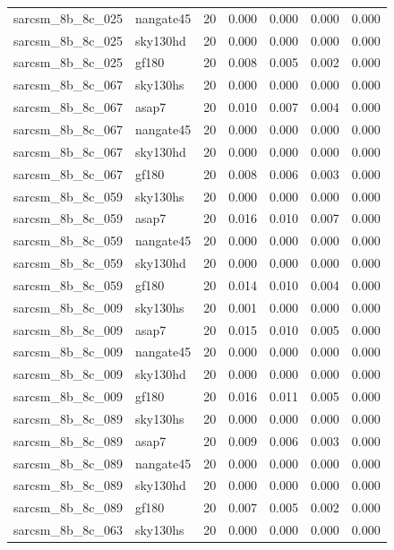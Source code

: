 \begin{tabular}{llrrrrr}
sarcsm\_8b\_8c\_025 & nangate45 & 20 & 0.000 & 0.000 & 0.000 & 0.000 \\
sarcsm\_8b\_8c\_025 & sky130hd & 20 & 0.000 & 0.000 & 0.000 & 0.000 \\
sarcsm\_8b\_8c\_025 & gf180 & 20 & 0.008 & 0.005 & 0.002 & 0.000 \\
sarcsm\_8b\_8c\_067 & sky130hs & 20 & 0.000 & 0.000 & 0.000 & 0.000 \\
sarcsm\_8b\_8c\_067 & asap7 & 20 & 0.010 & 0.007 & 0.004 & 0.000 \\
sarcsm\_8b\_8c\_067 & nangate45 & 20 & 0.000 & 0.000 & 0.000 & 0.000 \\
sarcsm\_8b\_8c\_067 & sky130hd & 20 & 0.000 & 0.000 & 0.000 & 0.000 \\
sarcsm\_8b\_8c\_067 & gf180 & 20 & 0.008 & 0.006 & 0.003 & 0.000 \\
sarcsm\_8b\_8c\_059 & sky130hs & 20 & 0.000 & 0.000 & 0.000 & 0.000 \\
sarcsm\_8b\_8c\_059 & asap7 & 20 & 0.016 & 0.010 & 0.007 & 0.000 \\
sarcsm\_8b\_8c\_059 & nangate45 & 20 & 0.000 & 0.000 & 0.000 & 0.000 \\
sarcsm\_8b\_8c\_059 & sky130hd & 20 & 0.000 & 0.000 & 0.000 & 0.000 \\
sarcsm\_8b\_8c\_059 & gf180 & 20 & 0.014 & 0.010 & 0.004 & 0.000 \\
sarcsm\_8b\_8c\_009 & sky130hs & 20 & 0.001 & 0.000 & 0.000 & 0.000 \\
sarcsm\_8b\_8c\_009 & asap7 & 20 & 0.015 & 0.010 & 0.005 & 0.000 \\
sarcsm\_8b\_8c\_009 & nangate45 & 20 & 0.000 & 0.000 & 0.000 & 0.000 \\
sarcsm\_8b\_8c\_009 & sky130hd & 20 & 0.000 & 0.000 & 0.000 & 0.000 \\
sarcsm\_8b\_8c\_009 & gf180 & 20 & 0.016 & 0.011 & 0.005 & 0.000 \\
sarcsm\_8b\_8c\_089 & sky130hs & 20 & 0.000 & 0.000 & 0.000 & 0.000 \\
sarcsm\_8b\_8c\_089 & asap7 & 20 & 0.009 & 0.006 & 0.003 & 0.000 \\
sarcsm\_8b\_8c\_089 & nangate45 & 20 & 0.000 & 0.000 & 0.000 & 0.000 \\
sarcsm\_8b\_8c\_089 & sky130hd & 20 & 0.000 & 0.000 & 0.000 & 0.000 \\
sarcsm\_8b\_8c\_089 & gf180 & 20 & 0.007 & 0.005 & 0.002 & 0.000 \\
sarcsm\_8b\_8c\_063 & sky130hs & 20 & 0.000 & 0.000 & 0.000 & 0.000 \\

\end{tabular}
